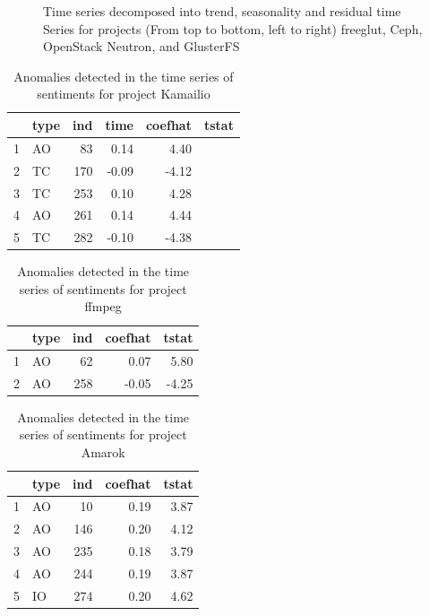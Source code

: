 \documentclass[12pt]{report}
\begin{document}
\begin{figure}[!htbp]
\caption{Time series decomposed into trend, seasonality and residual time Series for projects (From top to bottom, left to right) freeglut, Ceph, OpenStack Neutron, and GlusterFS}
\label{figureDecpmposed_9to12}
\end{figure}



\begin{table}
\centering
\caption{Anomalies detected in the time series of sentiments for project Kamailio}
\label{TableDiversityMeasuresKunegisEtAl}
\begin{tabular}{rlrrrr}
  \hline
 & type & ind & time & coefhat & tstat \\ 
  \hline
1 & AO &  83 & 0.14 & 4.40 \\ 
  2 & TC & 170 & -0.09 & -4.12 \\ 
  3 & TC & 253 & 0.10 & 4.28 \\ 
  4 & AO & 261 & 0.14 & 4.44 \\ 
  5 & TC & 282 & -0.10 & -4.38 \\ 
   \hline
\end{tabular}
\end{table}


\begin{table}
\centering
\caption{Anomalies detected in the time series of sentiments for project ffmpeg}
\begin{tabular}{rlrrr}
  \hline
 & type & ind & coefhat & tstat \\ 
  \hline
1 & AO &  62 & 0.07 & 5.80 \\ 
  2 & AO & 258 & -0.05 & -4.25 \\ 
   \hline
\end{tabular}
\end{table}


\begin{table}
\centering
\caption{Anomalies detected in the time series of sentiments for project Amarok}
\begin{tabular}{rlrrr}
  \hline
 & type & ind & coefhat & tstat \\ 
  \hline
1 & AO &  10 & 0.19 & 3.87 \\ 
  2 & AO & 146 & 0.20 & 4.12 \\ 
  3 & AO & 235 & 0.18 & 3.79 \\ 
  4 & AO & 244 & 0.19 & 3.87 \\ 
  5 & IO & 274 & 0.20 & 4.62 \\ 
   \hline
\end{tabular}
\end{table}
\end{document}
